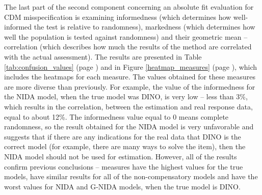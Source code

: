 \documentclass[english]{pwr_wmat_praca_dyplomowa}
\theoremstyle{plain}
\numberwithin{theorem}{chapter}
\theoremstyle{definition}
\numberwithin{theorem}{chapter}
\begin{document}
	The last part of the second component concerning an absolute ﬁt evaluation for CDM misspecification is examining informedness (which determines how well-informed the test is relative to randomness), markedness (which determines how well the population is tested against randomness) and their geometric mean -- correlation (which describes how much the results of the method are correlated with the actual assessment). The results are presented in Table \ref{tab:confusion_values} (page \pageref{tab:confusion_values}) and in Figure \ref{heatmap_measures} (page \pageref{heatmap_measures}), which includes the heatmaps for each measure. The values obtained for these measures are more diverse than previously. For example, the value of the informedness for the NIDA model, when the true model was DINO, is very low -- less than 3\%, which results in the correlation, between the estimation and real response data, equal to about 12\%. The informedness value equal to 0 means complete randomness, so the result obtained for the NIDA model is very unfavorable and suggests that if there are any indications for the real data that DINO is the correct model (for example, there are many ways to solve the item), then the NIDA model should not be used for estimation. However, all of the results confirm previous conclusions -- measures have the highest values for the true models, have similar results for all of the non-compensatory models and have the worst values for NIDA and G-NIDA models, when the true model is DINO.
	
\end{document}
